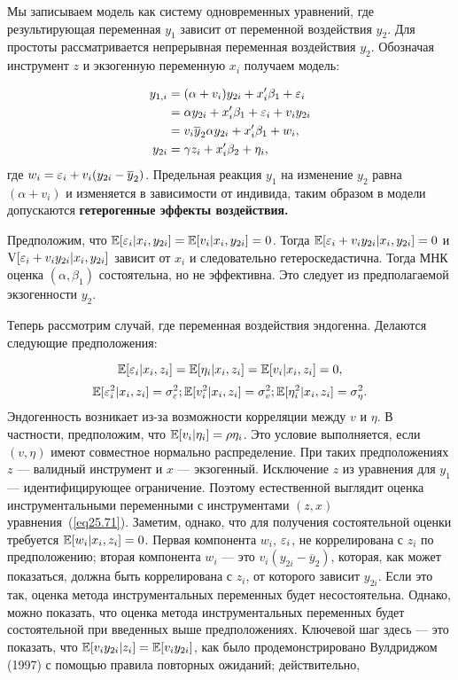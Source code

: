 Мы записываем модель как систему одновременных уравнений, где результирующая переменная $y_1$ зависит от переменной воздействия $y_2$. Для простоты рассматривается непрерывная переменная воздействия $y_2$. Обозначая инструмент $z$ и экзогенную переменную $x_i$ получаем модель:

\begin{align}
\label{eq25.71}
y_{1,i} & = (\alpha + v_i) y_{2i} + x'_i \beta_1 + \varepsilon_i  \\
& = \alpha y_{2i} + x'_i \beta_1 + \varepsilon_i + v_i y_{2i} \nonumber \\
& = v_i \overline{y}_2 \alpha y_{2i} + x'_i \beta_1 + w_i, \nonumber \\
\label{eq25.72}
y_{2i} & = \gamma z_i + x'_i \beta_2 + \eta_i ,
\end{align}
где $w_i = \varepsilon_i + v_i (y_{2i} - \overline{y}_2 )$. Предельная реакция $y_1$ на изменение $y_2$ равна $(\alpha + v_i)$ и изменяется в зависимости от индивида, таким образом в модели допускаются \bfseries гетерогенные эффекты воздействия. \mdseries

Предположим, что $\mathbb{E}[\varepsilon_i | x_i , y_{2i}] = \mathbb{E}[v_i | x_i , y_{2i}] = 0$. Тогда $ \mathbb{E}[\varepsilon_i + v_i y_{2i}| x_i , y_{2i}] = 0$ и $\mathrm{V}[\varepsilon_i + v_i y_{2i}| x_i , y_{2i}]$ зависит от $x_i$ и следовательно гетероскедастична. Тогда МНК оценка $(\alpha, \beta_1)$ состоятельна, но не эффективна. Это следует из предполагаемой экзогенности $y_2$. 

Теперь рассмотрим случай, где переменная воздействия эндогенна. Делаются следующие предположения:

\begin{equation}
\label{eq25.73}
\mathbb{E}[\varepsilon_i | x_i , z_i ] = \mathbb{E} [\eta_i | x_i , z_i] = \mathbb{E} [v_i | x_i , z_i ] = 0,
\end{equation}
\begin{equation}
\label{eq25.74}
\mathbb{E}[\varepsilon_i^2 | x_i , z_i ] = \sigma_{\varepsilon}^2 ; \mathbb{E} [v_i^2 | x_i , z_i] = \sigma_v^2 ; \mathbb{E} [\eta_i^2 | x_i , z_i ] = \sigma_{\eta}^2.
\end{equation}
Эндогенность возникает из-за возможности корреляции между $v$ и $\eta$. В частности, предположим, что $\mathbb{E}[v_i | \eta_i] = \rho \eta_i$. Это условие выполняется, если $(v,\eta)$ имеют совместное нормально распределение. При таких предположениях $z$ --- валидный инструмент и $x$ --- экзогенный. Исключение $z$ из уравнения для $y_1$ --- идентифицирующее ограничение. Поэтому естественной выглядит оценка инструментальными переменными с инструментами $(z,x)$ уравнения~(\ref{eq25.71}). Заметим, однако, что для получения состоятельной оценки требуется $\mathbb{E}[w_i | x_i, z_i] = 0$. Первая компонента $w_i$, $\varepsilon_i$, не коррелирована с $z_i$ по предположению; вторая компонента $w_i$ --- это $v_i(y_{2i} - \overline{y}_2)$, которая, как может показаться, должна быть коррелирована с $z_i$, от которого зависит $y_{2i}$. Если это так, оценка метода инструментальных переменных будет несостоятельна. Однако, можно показать, что оценка метода инструментальных переменных будет состоятельной при введенных выше предположениях. Ключевой шаг здесь --- это показать, что $\mathbb{E}[v_i y_{2i} | z_i] = \mathbb{E}[v_i y_{2i}]$, как было продемонстрировано Вулдриджом (1997) с помощью правила повторных ожиданий; действительно,


